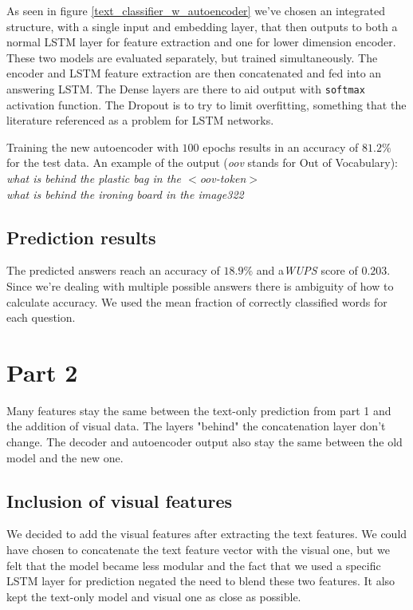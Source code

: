 \documentclass[10pt,a4paper]{report}
\begin{document}
	As seen in figure \ref{text_classifier_w_autoencoder} we've chosen an integrated structure, with a single input and embedding layer, that then outputs to both a normal LSTM layer for feature extraction and one for lower dimension encoder. These two models are evaluated separately, but trained simultaneously. The encoder and LSTM feature extraction are then concatenated and fed into an answering LSTM. The Dense layers are there to aid output with \texttt{softmax} activation function. The Dropout is to try to limit overfitting, something that the literature referenced as a problem for LSTM networks.
	
	Training the new autoencoder with $ 100 $ epochs results in an accuracy of $ 81.2 \%$ for the test data.  An example of the output (\textit{oov} stands for Out of Vocabulary):
	\\\textit{what is behind the plastic bag in the $ < $oov-token$ > $
	\\ what is behind the ironing board in the image322  }

	\subsection*{Prediction results}
	The predicted answers reach an accuracy of $ 18.9 \% $ and a\textit{WUPS} score of  $ 0.203 $. Since we're dealing with multiple possible answers there is ambiguity of how to calculate accuracy. We used the mean fraction of correctly classified words for each question.


\pagebreak



	\section*{Part 2}
	Many features stay the same between the text-only prediction from part 1 and the addition of visual data. The layers "behind" the concatenation layer don't change. The decoder and autoencoder output also stay the same between the old model and the new one.
	\subsection*{Inclusion of visual features}
	We decided to add the visual features after extracting the text features. We could have chosen to concatenate the text feature vector with the visual one, but we felt that the model became less modular and the fact that we used a specific LSTM layer for prediction negated the need to blend these two features. It also kept the text-only model and visual one as close as possible. 
\end{document}
